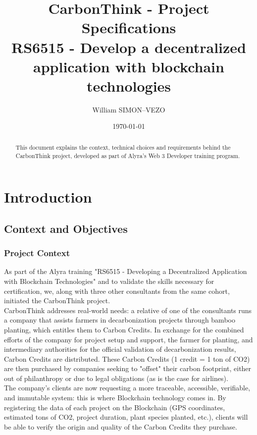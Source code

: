 \documentclass[a4paper, 12pt]{article}
\title{%
  CarbonThink - Project Specifications \\
  \large RS6515 - Develop a decentralized application with blockchain technologies}
\author{William SIMON--VEZO}
\date{\today}
\begin{document}
\begin{figure}
\centering

\end{figure}

\maketitle

\begin{abstract}
This document explains the context, technical choices and requirements behind the CarbonThink project, developed as part of Alyra's Web 3 Developer training program.
\end{abstract}

\tableofcontents
\newpage

\section{Introduction}

\subsection{Context and Objectives}
\subsubsection{Project Context}
As part of the Alyra training "RS6515 - Developing a Decentralized Application with Blockchain Technologies" and to validate the skills necessary for certification, we, along with three other consultants from the same cohort, initiated the CarbonThink project.\\

CarbonThink addresses real-world needs: a relative of one of the consultants runs a company that assists farmers in decarbonization projects through bamboo planting, which entitles them to Carbon Credits. In exchange for the combined efforts of the company for project setup and support, the farmer for planting, and intermediary authorities for the official validation of decarbonization results, Carbon Credits are distributed. These Carbon Credits (1 credit = 1 ton of CO2) are then purchased by companies seeking to "offset" their carbon footprint, either out of philanthropy or due to legal obligations (as is the case for airlines).\\

The company's clients are now requesting a more traceable, accessible, verifiable, and immutable system: this is where Blockchain technology comes in. By registering the data of each project on the Blockchain (GPS coordinates, estimated tons of CO2, project duration, plant species planted, etc.), clients will be able to verify the origin and quality of the Carbon Credits they purchase.\\
\end{document}
